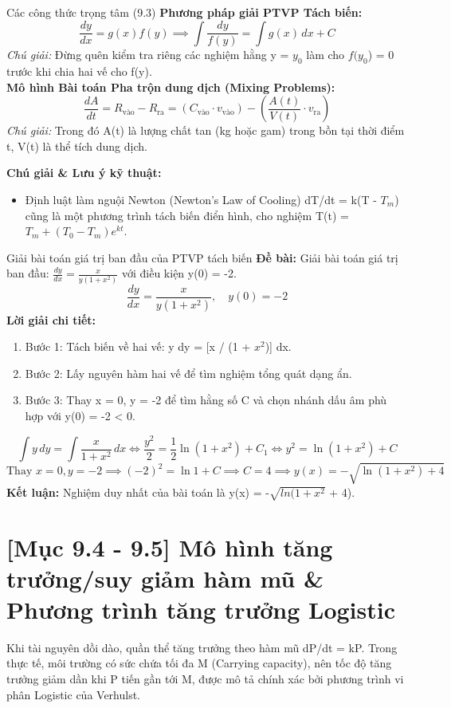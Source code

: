 \documentclass[11pt,a4paper,oneside]{book}
\begin{document}
\begin{congthuc}{Các công thức trọng tâm (9.3)}
\noindent\textbf{Phương pháp giải PTVP Tách biến:}
\[ \frac{dy}{dx} = g(x)f(y) \implies \int \frac{dy}{f(y)} = \int g(x)\,dx + C \]
\noindent\textit{Chú giải:} Đừng quên kiểm tra riêng các nghiệm hằng y = $y_0$ làm cho $f(y_0$) = 0 trước khi chia hai vế cho f(y).\\[4pt]
\noindent\textbf{Mô hình Bài toán Pha trộn dung dịch (Mixing Problems):}
\[ \frac{dA}{dt} = R_{\text{vào}} - R_{\text{ra}} = (C_{\text{vào}} \cdot v_{\text{vào}}) - \left(\frac{A(t)}{V(t)} \cdot v_{\text{ra}}\right) \]
\noindent\textit{Chú giải:} Trong đó A(t) là lượng chất tan (kg hoặc gam) trong bồn tại thời điểm t, V(t) là thể tích dung dịch.\\[4pt]
\end{congthuc}

\noindent\textbf{Chú giải \& Lưu ý kỹ thuật:}
\begin{itemize}[leftmargin=1.5em, itemsep=2pt]
  \item Định luật làm nguội Newton (Newton's Law of Cooling) dT/dt = k(T - $T_m$) cũng là một phương trình tách biến điển hình, cho nghiệm T(t) = $T_m + (T_0 - T_m)e^{kt}$.
\end{itemize}

\begin{vidu}{Giải bài toán giá trị ban đầu của PTVP tách biến}
\textbf{Đề bài:} Giải bài toán giá trị ban đầu: $\frac{dy}{dx} = \frac{x}{y(1 + x^2)}$ với điều kiện y(0) = -2.
\[ \frac{dy}{dx} = \frac{x}{y(1 + x^2)}, \quad y(0) = -2 \]
\textbf{Lời giải chi tiết:}
\begin{enumerate}[leftmargin=1.5em, itemsep=2pt]
  \item Bước 1: Tách biến về hai vế: y dy = [x / (1 + $x^2$)] dx.
  \item Bước 2: Lấy nguyên hàm hai vế để tìm nghiệm tổng quát dạng ẩn.
  \item Bước 3: Thay x = 0, y = -2 để tìm hằng số C và chọn nhánh dấu âm phù hợp với y(0) = -2 < 0.
\end{enumerate}
\[ \int y\,dy = \int \frac{x}{1 + x^2}\,dx \iff \frac{y^2}{2} = \frac{1}{2}\ln(1 + x^2) + C_1 \iff y^2 = \ln(1 + x^2) + C \]
\[ \text{Thay } x = 0, y = -2 \implies (-2)^2 = \ln 1 + C \implies C = 4 \implies y(x) = -\sqrt{\ln(1 + x^2) + 4} \]
\noindent\textbf{Kết luận:} Nghiệm duy nhất của bài toán là y(x) = -$\sqrt{ln(1 + x^2}$ + 4).
\end{vidu}

\section{[Mục 9.4 - 9.5] Mô hình tăng trưởng/suy giảm hàm mũ \& Phương trình tăng trưởng Logistic}
Khi tài nguyên dồi dào, quần thể tăng trưởng theo hàm mũ dP/dt = kP. Trong thực tế, môi trường có sức chứa tối đa M (Carrying capacity), nên tốc độ tăng trưởng giảm dần khi P tiến gần tới M, được mô tả chính xác bởi phương trình vi phân Logistic của Verhulst.
\end{document}
